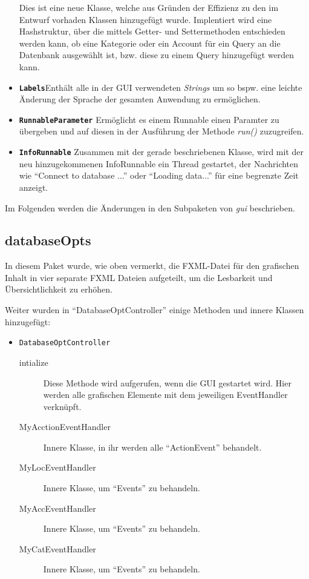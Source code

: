 \begin{itemize}
	Dies ist eine neue Klasse, welche aus Gründen der Effizienz zu den im Entwurf vorhaden Klassen hinzugefügt wurde. Implentiert wird eine Hashstruktur, über die mittels Getter- und Settermethoden entschieden werden kann, ob eine Kategorie oder ein Account für ein Query an die Datenbank ausgewählt ist, bzw. diese zu einem Query hinzugefügt werden kann.
	\item \textbf{\lstinline{Labels}}\quad Enthält alle in der GUI verwendeten \emph{Strings} um so bspw. eine leichte Änderung der Sprache der gesamten Anwendung zu ermöglichen.
	\item \textbf{\lstinline{RunnableParameter}} Ermöglicht es einem Runnable einen Paramter zu übergeben und auf diesen in der Ausführung der Methode \emph{run()} zuzugreifen.
	\item \textbf{\lstinline{InfoRunnable}} \quad Zusammen mit der gerade beschriebenen Klasse, wird mit der neu hinzugekommenen InfoRunnable ein Thread gestartet, der Nachrichten wie "`Connect to database ..."' oder "`Loading data..."' für eine begrenzte Zeit anzeigt.
\end{itemize}

Im Folgenden werden die Änderungen in den Subpaketen von \emph{gui} beschrieben.

\subsection{databaseOpts}
In diesem Paket wurde, wie oben vermerkt, die FXML-Datei für den grafischen Inhalt in vier separate FXML Dateien aufgeteilt, um die Lesbarkeit und Übersichtlichkeit zu erhöhen.


Weiter wurden in "`DatabaseOptController"' einige Methoden und innere Klassen hinzugefügt:
\begin{itemize}
	\item \lstinline{DatabaseOptController}
	\quad
	\begin{description}
		\item[intialize]
		\quad
		Diese Methode wird aufgerufen, wenn die GUI gestartet wird. Hier werden alle grafischen Elemente mit dem jeweiligen EventHandler verknüpft.
	
			\item[MyAcctionEventHandler] Innere Klasse, in ihr werden alle "`ActionEvent"' behandelt. 
			\item[MyLocEventHandler] Innere Klasse, um "`Events"' zu behandeln.
			\item[MyAccEventHandler] Innere Klasse, um "`Events"' zu behandeln.
			\item[MyCatEventHandler] Innere Klasse, um "`Events"' zu behandeln.
		\end{description}
\end{itemize}
	
